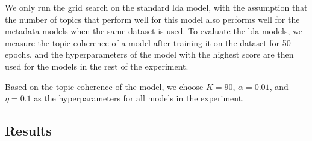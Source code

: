 We only run the grid search on the standard \gls{lda} model, with the assumption that the number of topics that perform well for this model also performs well for the metadata models when the same dataset is used.
To evaluate the \gls{lda} models, we measure the topic coherence of a model after training it on the dataset for 50 epochs, and the hyperparameters of the model with the highest score are then used for the models in the rest of the experiment.

Based on the topic coherence of the model, we choose $K = 90$, $\alpha = 0.01$, and $\eta = 0.1$ as the hyperparameters for all models in the experiment.



\subsection{Results}\label{sec:results}


